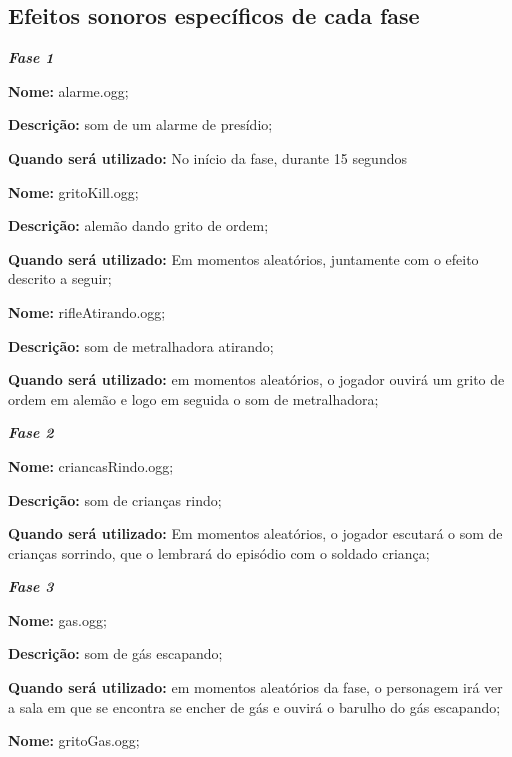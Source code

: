 \subsection{\label{efxF}Efeitos sonoros específicos de cada fase}
\begin{list}{}{}
\item\textbf{\textit{Fase 1}}
\item\textbf{Nome:} alarme.ogg;

\textbf{Descrição:} som de um alarme de presídio;

\textbf{Quando será utilizado:} No início da fase, durante 15 segundos \\

\item\textbf{Nome:} gritoKill.ogg;

\textbf{Descrição:} alemão dando grito de ordem;

\textbf{Quando será utilizado:} Em momentos aleatórios, juntamente com o efeito descrito a seguir; \\

\item\textbf{Nome:} rifleAtirando.ogg;

\textbf{Descrição:} som de metralhadora atirando;

\textbf{Quando será utilizado:} em momentos aleatórios, o jogador ouvirá um grito de ordem em alemão e logo em seguida o som de metralhadora; \\

\item\textbf{\textit{Fase 2}}
\item\textbf{Nome:} criancasRindo.ogg;

\textbf{Descrição:} som de crianças rindo;

\textbf{Quando será utilizado:} Em momentos aleatórios, o jogador escutará o som de crianças sorrindo, que o lembrará do episódio com o soldado criança; \\

\item\textbf{\textit{Fase 3}}
\item\textbf{Nome:} gas.ogg;

\textbf{Descrição:} som de gás escapando;

\textbf{Quando será utilizado:} em momentos aleatórios da fase, o personagem irá ver a sala em que se encontra se encher de gás e ouvirá o barulho do gás escapando;  \\

\item\textbf{Nome:} gritoGas.ogg;


\end{list}
